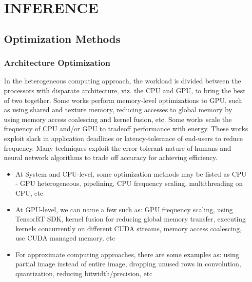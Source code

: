 \chapter{INFERENCE}

\renewcommand{\headrulewidth}{0.5pt}
\renewcommand{\footrulewidth}{0.5pt}
\thispagestyle{plain}
\pagestyle{fancy}
\fancyhf{}
\raggedright
{}

\section{Optimization Methods}

    \subsection{Architecture Optimization}
        In the heterogeneous computing approach, the workload is divided between the processors with disparate architecture, viz. the CPU and GPU, to bring the best of two together. 
        Some works perform memory-level optimizations to GPU, such as using shared and texture memory, reducing accesses to global memory by using memory access coalescing and kernel fusion, etc. 
        Some works scale the frequency of CPU and/or GPU to tradeoff performance with energy. These works exploit slack in application deadlines or latency-tolerance of end-users to reduce frequency. 
        Many techniques exploit the error-tolerant nature of humans and neural network algorithms to trade off accuracy for achieving efficiency.
        \begin{itemize}
            \item At System and CPU-level, some optimization methods may be listed as CPU - GPU heterogeneous, pipelining, CPU frequency scaling, multithreading on CPU, etc
            \item At GPU-level, we can name a few such as: GPU frequency scaling, using TensorRT SDK, kernel fusion for reducing global memory transfer, executing kernels concurrently on different CUDA streams, 
            memory access coalescing, use CUDA managed memory, etc
            \item For approximate computing approaches, there are some examples as: using partial image instead of entire image, dropping unused rows in convolution, quantization, reducing bitwidth/precision, etc
        \end{itemize}

